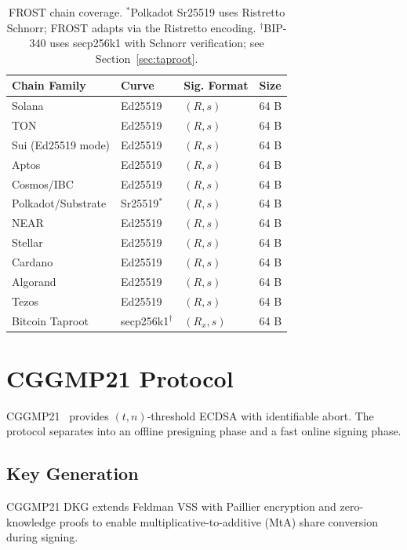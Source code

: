 \documentclass[11pt,twocolumn]{article}
\begin{document}
\begin{table}[H]
\centering
\small
\begin{tabular}{@{}llll@{}}
\toprule
\textbf{Chain Family} & \textbf{Curve} & \textbf{Sig. Format} & \textbf{Size} \\
\midrule
Solana & Ed25519 & $(R, s)$ & 64 B \\
TON & Ed25519 & $(R, s)$ & 64 B \\
Sui (Ed25519 mode) & Ed25519 & $(R, s)$ & 64 B \\
Aptos & Ed25519 & $(R, s)$ & 64 B \\
Cosmos/IBC & Ed25519 & $(R, s)$ & 64 B \\
Polkadot/Substrate & Sr25519${}^*$ & $(R, s)$ & 64 B \\
NEAR & Ed25519 & $(R, s)$ & 64 B \\
Stellar & Ed25519 & $(R, s)$ & 64 B \\
Cardano & Ed25519 & $(R, s)$ & 64 B \\
Algorand & Ed25519 & $(R, s)$ & 64 B \\
Tezos & Ed25519 & $(R, s)$ & 64 B \\
Bitcoin Taproot & secp256k1${}^\dagger$ & $(R_x, s)$ & 64 B \\
\bottomrule
\end{tabular}
\caption{FROST chain coverage. ${}^*$Polkadot Sr25519 uses Ristretto Schnorr; FROST
adapts via the Ristretto encoding. ${}^\dagger$BIP-340 uses secp256k1 with Schnorr
verification; see Section~\ref{sec:taproot}.}
\label{tab:frost-chains}
\end{table}

\section{CGGMP21 Protocol}
\label{sec:cggmp}

CGGMP21~\cite{canetti2021cggmp} provides $(t,n)$-threshold ECDSA with identifiable
abort. The protocol separates into an offline presigning phase and a fast online
signing phase.

\subsection{Key Generation}

CGGMP21 DKG extends Feldman VSS with Paillier encryption and zero-knowledge proofs to
enable multiplicative-to-additive (MtA) share conversion during signing.
\end{document}
